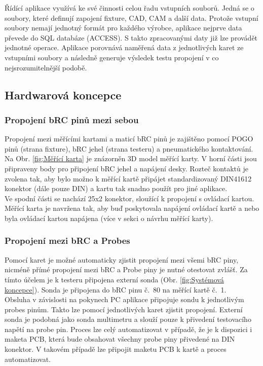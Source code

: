     Řídící aplikace využívá ke své činnosti celou řadu vstupních souborů. Jedná se o soubory, které definují zapojení fixture, CAD, CAM a další data\cite{CAD_wiki}.
    Protože vstupní soubory nemají jednotný formát pro každého výrobce, aplikace nejprve data převede do SQL databáze (ACCESS). S takto zpracovanými daty již lze
    provádět jednotné operace. Aplikace porovnává naměřená data z jednotlivých karet ze vstupními soubory a následně generuje výsledek testu propojení
    v co nejsrozumitelnější podobě.

    \subsection{Hardwarová koncepce}
    \subsubsection{Propojení bRC pinů mezi sebou}

    Propojení mezi měřícími kartami a maticí bRC pinů je zajištěno pomocí POGO pinů (strana fixture),
    bRC jehel (strana testeru) a pneumatického kontaktování.
    Na Obr. \ref{fig:Měřící karta} je znázorněn 3D model měřící karty. V horní části jsou připraveny 
    body pro připojení bRC jehel a napájení desky. Rozteč kontaktů je zvolena tak, aby bylo možno
    k měřící kartě připájet standardizovaný DIN41612 konektor (dále pouze DIN) a kartu tak snadno použít pro jiné aplikace.\\

    Ve spodní části se nachází 25x2 konektor, sloužící k propojení s ovládací kartou. Měřící karta je navržena tak, aby buď poskytovala
    napájení ovládací kartě a nebo byla ovládací kartou napájena (více v sekci o návrhu měřící karty).

    \subsubsection{Propojení mezi bRC a Probes}
    Pomocí karet je možné automaticky zjistit propojení mezi všemi bRC piny,
    nicméně přímé propojení mezi bRC a Probe piny je nutné otestovat zvlášť.
    Za tímto účelem je k testeru připojena externí sonda (Obr. \ref{fig:Systémová koncepce}).
    Sonda je připojena do bRC pinu \hbox{č. 80} na měřící
    kartě \hbox{č. 1.}\\

    Obsluha v závislosti na pokynech PC aplikace připojuje sondu k jednotlivým probes pinům.
    Takto lze pomocí jednotlivých karet zjistit propojení.
    Externí sonda je podobná jako sonda multimetru a slouží pouze k přivedení testovacího napětí na probe pin.
    Proces lze celý automatizovat v případě, že je k dispozici i maketa PCB,
    která bude obsahovat všechny probe piny přivedené na DIN konektor.
    V takovém případě lze připojit maketu PCB k kartě a proces automatizovat.

